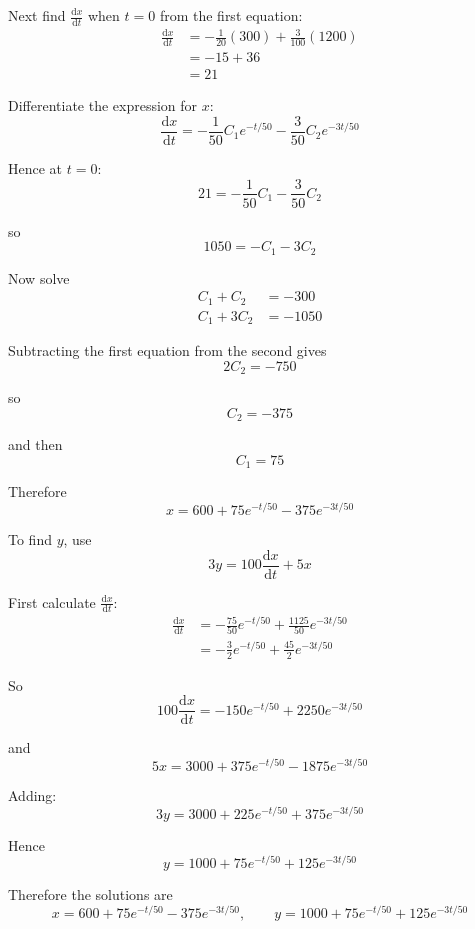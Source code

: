\documentclass[leqno]{article}
\begin{document}
\begin{enumerate}[
  label=\textbf{\arabic*.},
  leftmargin=*,
  topsep=0pt,
  partopsep=0pt,
  parsep=0pt
]
\begin{djsSolution}
\begin{enumerate}[label=\textbf{(\alph*)}]
Next find $\frac{\mathrm{d}x}{\mathrm{d}t}$ when $t=0$ from the first equation:
\begin{align*}
\frac{\mathrm{d}x}{\mathrm{d}t}
&= -\frac{1}{20}(300)+\frac{3}{100}(1200) \\
&= -15+36 \\
&= 21
\end{align*}

Differentiate the expression for $x$:
\[
\frac{\mathrm{d}x}{\mathrm{d}t}=-\frac{1}{50}C_1e^{-t/50}-\frac{3}{50}C_2e^{-3t/50}
\]

Hence at $t=0$:
\[
21=-\frac{1}{50}C_1-\frac{3}{50}C_2
\]

so
\[
1050=-C_1-3C_2
\]

Now solve
\begin{align*}
C_1+C_2&=-300 \\
C_1+3C_2&=-1050
\end{align*}

Subtracting the first equation from the second gives
\[
2C_2=-750
\]

so
\[
C_2=-375
\]

and then
\[
C_1=75
\]

Therefore
\[
x=600+75e^{-t/50}-375e^{-3t/50}
\]

To find $y$, use
\[
3y=100\frac{\mathrm{d}x}{\mathrm{d}t}+5x
\]

First calculate $\frac{\mathrm{d}x}{\mathrm{d}t}$:
\begin{align*}
\frac{\mathrm{d}x}{\mathrm{d}t}
&= -\frac{75}{50}e^{-t/50}+\frac{1125}{50}e^{-3t/50} \\
&= -\frac{3}{2}e^{-t/50}+\frac{45}{2}e^{-3t/50}
\end{align*}

So
\[
100\frac{\mathrm{d}x}{\mathrm{d}t}=-150e^{-t/50}+2250e^{-3t/50}
\]

and
\[
5x=3000+375e^{-t/50}-1875e^{-3t/50}
\]

Adding:
\[
3y=3000+225e^{-t/50}+375e^{-3t/50}
\]

Hence
\[
y=1000+75e^{-t/50}+125e^{-3t/50}
\]

Therefore the solutions are
\[
x=600+75e^{-t/50}-375e^{-3t/50},
\qquad
y=1000+75e^{-t/50}+125e^{-3t/50}
\]
\end{enumerate}
\end{djsSolution}


\newpage

\questionitem


\end{enumerate}
\end{document}
